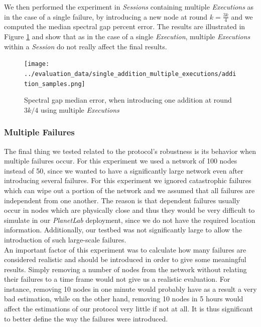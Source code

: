 \documentclass[a4paper,11pt,twoside]{report}
\begin{document}
We then performed the experiment in \textit{Sessions} containing multiple \textit{Executions} as in the case of a single failure, by introducing a new node at round $k=\frac{3k}{4}$ and we computed the median spectral gap percent error. The results are illustrated in Figure \ref{fig:single_addition_multiple} and show that as in the case of a single \textit{Execution}, multiple \textit{Executions} within a \textit{Session} do not really affect the final results. 


\begin{figure} [H]
   \centering
    \texttt{[image: ../evaluation\_data/single\_addition\_multiple\_executions/addition\_samples.png]}
     \caption{Spectral gap median error, when introducing one addition at round $3k/4$ using multiple \textit{Executions}}
     \label{fig:single_addition_multiple}
\end{figure}

\subsubsection*{Multiple Failures}

The final thing we tested related to the protocol's robustness is its behavior when multiple failures occur. For this experiment we used a network of 100 nodes instead of 50, since we wanted to have a significantly large network even after introducing several failures. For this experiment we  ignored catastrophic failures which can wipe out a portion of the network and we assumed that all failures are independent from one another. The reason is that dependent failures usually occur in nodes which are physically close and thus they would be very difficult to simulate in our \textit{PlanetLab} deployment, since we do not have the required location information. Additionally, our testbed was not significantly large to allow the introduction of such large-scale failures. \\

An important factor of this experiment was to calculate how many failures are considered realistic 	and should be introduced in order to give some meaningful results. Simply removing a number of nodes from the network without relating their failures to a time frame would not give us a realistic evaluation. For instance, removing 10 nodes in one minute would probably have as a result a very bad estimation, while on the other hand, removing 10 nodes in 5 hours would affect the estimations of our protocol very little if not at all. It is thus significant to better define the way the failures were introduced. \\
\end{document}
